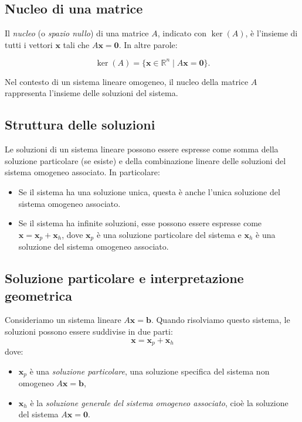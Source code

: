 \documentclass{article}
\begin{document}
\subsection{Nucleo di una matrice}

Il \emph{nucleo} (o \emph{spazio nullo}) di una matrice \( A \), indicato con
\( \ker(A) \), è l'insieme di tutti i vettori \( \mathbf{x} \) tali che \( A
\mathbf{x} = \mathbf{0} \). In altre parole:

\[
	\ker(A) = \{ \mathbf{x} \in \mathbb{R}^n \mid A \mathbf{x} = \mathbf{0} \}.
\]

Nel contesto di un sistema lineare omogeneo, il nucleo della matrice \( A \)
rappresenta l'insieme delle soluzioni del sistema.

\subsection{Struttura delle soluzioni}

Le soluzioni di un sistema lineare possono essere espresse come somma della
soluzione particolare (se esiste) e della combinazione lineare delle soluzioni
del sistema omogeneo associato. In particolare:
\begin{itemize}
	\item Se il sistema ha una soluzione unica, questa è anche l'unica soluzione del
	      sistema omogeneo associato.
	\item Se il sistema ha infinite soluzioni, esse possono essere espresse come \(
	      \mathbf{x} = \mathbf{x}_p + \mathbf{x}_h \), dove \( \mathbf{x}_p \) è una
	      soluzione particolare del sistema e \( \mathbf{x}_h \) è una soluzione del
	      sistema omogeneo associato.
\end{itemize}

\subsection{Soluzione particolare e interpretazione geometrica}

Consideriamo un sistema lineare \( A \mathbf{x} = \mathbf{b} \). Quando
risolviamo questo sistema, le soluzioni possono essere suddivise in due parti:
\[
	\mathbf{x} = \mathbf{x}_p + \mathbf{x}_h
\]
dove:
\begin{itemize}
	\item \( \mathbf{x}_p \) è una \emph{soluzione particolare}, una soluzione specifica del sistema non omogeneo \( A \mathbf{x} = \mathbf{b} \),
	\item \( \mathbf{x}_h \) è la \emph{soluzione generale del sistema omogeneo associato}, cioè la soluzione del sistema \( A \mathbf{x} = \mathbf{0} \).
\end{itemize}
\end{document}
